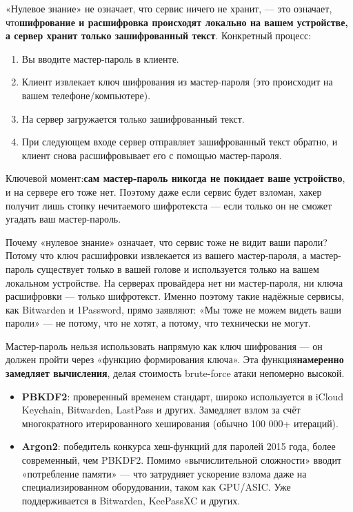 
«Нулевое знание» не означает, что сервис ничего не хранит, — это означает, что\textbf{шифрование и расшифровка происходят локально на вашем устройстве, а сервер хранит только зашифрованный текст}. Конкретный процесс:

\begin{enumerate}
  \item Вы вводите мастер-пароль в клиенте.
  \item Клиент извлекает ключ шифрования из мастер-пароля (это происходит на вашем телефоне/компьютере).
  \item На сервер загружается только зашифрованный текст.
  \item При следующем входе сервер отправляет зашифрованный текст обратно, и клиент снова расшифровывает его с помощью мастер-пароля.
\end{enumerate}

Ключевой момент:\textbf{сам мастер-пароль никогда не покидает ваше устройство}, и на сервере его тоже нет. Поэтому даже если сервис будет взломан, хакер получит лишь стопку нечитаемого шифротекста — если только он не сможет угадать ваш мастер-пароль.

\begin{tcbinfo}{Почему «нулевое знание» означает, что сервис тоже не видит ваши пароли?}
Потому что ключ расшифровки извлекается из вашего мастер-пароля, а мастер-пароль существует только в вашей голове и используется только на вашем локальном устройстве. На серверах провайдера нет ни мастер-пароля, ни ключа расшифровки — только шифротекст. Именно поэтому такие надёжные сервисы, как Bitwarden и 1Password, прямо заявляют: «Мы тоже не можем видеть ваши пароли» — не потому, что не хотят, а потому, что технически не могут.

\end{tcbinfo}


Мастер-пароль нельзя использовать напрямую как ключ шифрования — он должен пройти через «функцию формирования ключа». Эта функция\textbf{намеренно замедляет вычисления}, делая стоимость brute-force атаки непомерно высокой.

\begin{itemize}
  \item \textbf{PBKDF2}: проверенный временем стандарт, широко используется в iCloud Keychain, Bitwarden, LastPass и других. Замедляет взлом за счёт многократного итерированного хеширования (обычно 100 000+ итераций).
  \item \textbf{Argon2}: победитель конкурса хеш-функций для паролей 2015 года, более современный, чем PBKDF2. Помимо «вычислительной сложности» вводит «потребление памяти» — что затрудняет ускорение взлома даже на специализированном оборудовании, таком как GPU/ASIC. Уже поддерживается в Bitwarden, KeePassXC и других.
\end{itemize}

